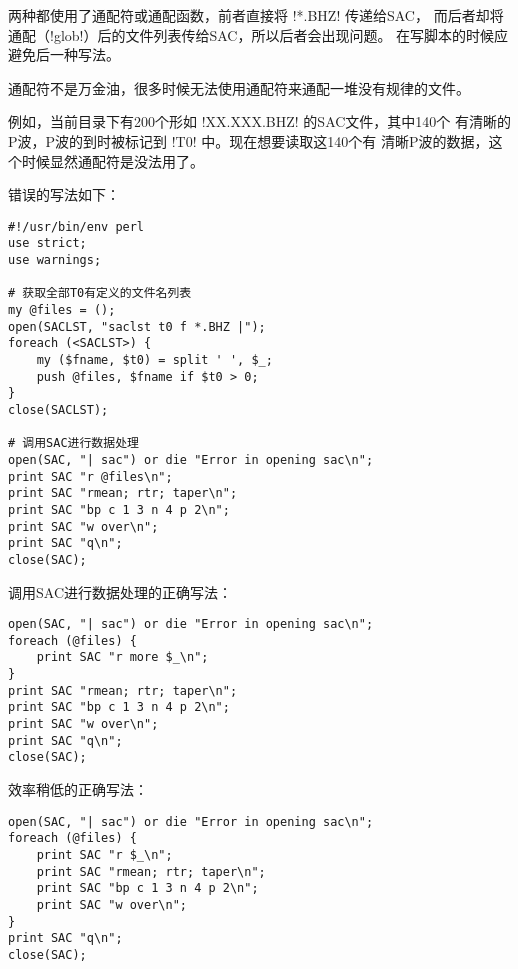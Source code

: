 两种都使用了通配符或通配函数，前者直接将 !*.BHZ! 传递给SAC，
而后者却将通配（!glob!）后的文件列表传给SAC，所以后者会出现问题。
在写脚本的时候应避免后一种写法。

通配符不是万金油，很多时候无法使用通配符来通配一堆没有规律的文件。

例如，当前目录下有200个形如 !XX.XXX.BHZ! 的SAC文件，其中140个
有清晰的P波，P波的到时被标记到 !T0! 中。现在想要读取这140个有
清晰P波的数据，这个时候显然通配符是没法用了。

错误的写法如下：
\begin{verbatim}
#!/usr/bin/env perl
use strict;
use warnings;

# 获取全部T0有定义的文件名列表
my @files = ();
open(SACLST, "saclst t0 f *.BHZ |");
foreach (<SACLST>) {
    my ($fname, $t0) = split ' ', $_;
    push @files, $fname if $t0 > 0;
}
close(SACLST);

# 调用SAC进行数据处理
open(SAC, "| sac") or die "Error in opening sac\n";
print SAC "r @files\n";
print SAC "rmean; rtr; taper\n";
print SAC "bp c 1 3 n 4 p 2\n";
print SAC "w over\n";
print SAC "q\n";
close(SAC);
\end{verbatim}

调用SAC进行数据处理的正确写法：
\begin{verbatim}
open(SAC, "| sac") or die "Error in opening sac\n";
foreach (@files) {
    print SAC "r more $_\n";
}
print SAC "rmean; rtr; taper\n";
print SAC "bp c 1 3 n 4 p 2\n";
print SAC "w over\n";
print SAC "q\n";
close(SAC);
\end{verbatim}

效率稍低的正确写法：
\begin{verbatim}
open(SAC, "| sac") or die "Error in opening sac\n";
foreach (@files) {
    print SAC "r $_\n";
    print SAC "rmean; rtr; taper\n";
    print SAC "bp c 1 3 n 4 p 2\n";
    print SAC "w over\n";
}
print SAC "q\n";
close(SAC);
\end{verbatim}
